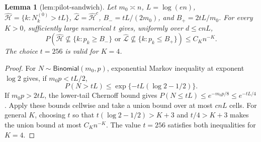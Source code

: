 \documentclass{article}
\newtheorem{lemma}{Lemma}
\begin{document}
\begin{lemma}[lem:pilot-sandwich]\label{lem:pilot-sandwich}
Let \(m_0\asymp n\), \(L=\log(en)\), \(\widehat{\mathcal H}=\{k:N_k^{(0)}>tL\}\), \(\widehat{\mathcal L}=\widehat{\mathcal H}^c\), \(B_-=tL/(2m_0)\), and \(B_+=2tL/m_0\). For every \(K>0\), sufficiently large numerical \(t\) gives, uniformly over \(d\le cnL\),
\[
P\left(\widehat{\mathcal H}\not\subseteq\{k:p_k\ge B_-\}\text{ or }\widehat{\mathcal L}\not\subseteq\{k:p_k\le B_+\}\right)\le C_Kn^{-K}.
\]
The choice \(t=256\) is valid for \(K=4\).
\end{lemma}
\begin{proof}
For \(N\sim\mathsf{Binomial}(m_0,p)\), exponential Markov inequality at exponent \(\log2\) gives, if \(m_0p<tL/2\),
\[
P(N>tL)\le\exp\{-tL(\log2-1/2)\}.
\tag{1}
\]
If \(m_0p>2tL\), the lower-tail Chernoff bound gives \(P(N\le tL)\le e^{-m_0p/8}\le e^{-tL/4}\). Apply these bounds cellwise and take a union bound over at most \(cnL\) cells. For general \(K\), choosing \(t\) so that \(t(\log2-1/2)>K+3\) and \(t/4>K+3\) makes the union bound at most \(C_Kn^{-K}\). The value \(t=256\) satisfies both inequalities for \(K=4\).
\end{proof}
\end{document}

